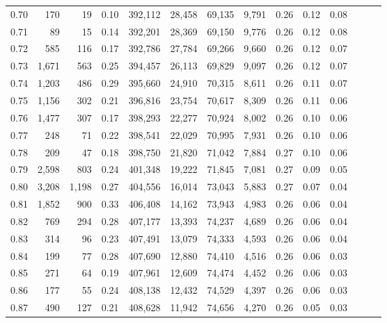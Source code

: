 \begin{tabular}{rrrrrrrrrrrrrr}
0.70 &     170 &     19 &  0.10 &  392,112 &   28,458 &  69,135 &   9,791 &  0.26 &  0.12 &      0.08 \\
0.71 &      89 &     15 &  0.14 &  392,201 &   28,369 &  69,150 &   9,776 &  0.26 &  0.12 &      0.08 \\
0.72 &     585 &    116 &  0.17 &  392,786 &   27,784 &  69,266 &   9,660 &  0.26 &  0.12 &      0.07 \\
0.73 &   1,671 &    563 &  0.25 &  394,457 &   26,113 &  69,829 &   9,097 &  0.26 &  0.12 &      0.07 \\
0.74 &   1,203 &    486 &  0.29 &  395,660 &   24,910 &  70,315 &   8,611 &  0.26 &  0.11 &      0.07 \\
0.75 &   1,156 &    302 &  0.21 &  396,816 &   23,754 &  70,617 &   8,309 &  0.26 &  0.11 &      0.06 \\
0.76 &   1,477 &    307 &  0.17 &  398,293 &   22,277 &  70,924 &   8,002 &  0.26 &  0.10 &      0.06 \\
0.77 &     248 &     71 &  0.22 &  398,541 &   22,029 &  70,995 &   7,931 &  0.26 &  0.10 &      0.06 \\
0.78 &     209 &     47 &  0.18 &  398,750 &   21,820 &  71,042 &   7,884 &  0.27 &  0.10 &      0.06 \\
0.79 &   2,598 &    803 &  0.24 &  401,348 &   19,222 &  71,845 &   7,081 &  0.27 &  0.09 &      0.05 \\
0.80 &   3,208 &  1,198 &  0.27 &  404,556 &   16,014 &  73,043 &   5,883 &  0.27 &  0.07 &      0.04 \\
0.81 &   1,852 &    900 &  0.33 &  406,408 &   14,162 &  73,943 &   4,983 &  0.26 &  0.06 &      0.04 \\
0.82 &     769 &    294 &  0.28 &  407,177 &   13,393 &  74,237 &   4,689 &  0.26 &  0.06 &      0.04 \\
0.83 &     314 &     96 &  0.23 &  407,491 &   13,079 &  74,333 &   4,593 &  0.26 &  0.06 &      0.04 \\
0.84 &     199 &     77 &  0.28 &  407,690 &   12,880 &  74,410 &   4,516 &  0.26 &  0.06 &      0.03 \\
0.85 &     271 &     64 &  0.19 &  407,961 &   12,609 &  74,474 &   4,452 &  0.26 &  0.06 &      0.03 \\
0.86 &     177 &     55 &  0.24 &  408,138 &   12,432 &  74,529 &   4,397 &  0.26 &  0.06 &      0.03 \\
0.87 &     490 &    127 &  0.21 &  408,628 &   11,942 &  74,656 &   4,270 &  0.26 &  0.05 &      0.03 \\

\end{tabular}
